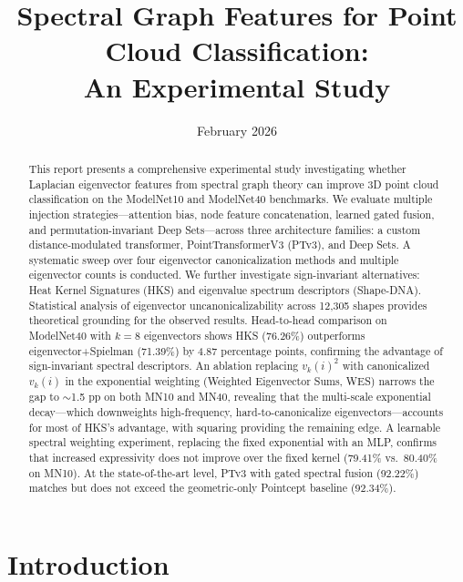 \documentclass[11pt]{article}
\title{Spectral Graph Features for Point Cloud Classification:\\An Experimental Study}
\author{}
\date{February 2026}
\begin{document}
\maketitle

\begin{abstract}
This report presents a comprehensive experimental study investigating whether Laplacian
eigenvector features from spectral graph theory can improve 3D point cloud classification
on the ModelNet10 and ModelNet40 benchmarks. We evaluate multiple injection
strategies---attention bias, node feature concatenation, learned gated fusion, and
permutation-invariant Deep Sets---across three architecture families: a custom
distance-modulated transformer, PointTransformerV3 (PTv3), and Deep Sets. A systematic
sweep over four eigenvector canonicalization methods and multiple eigenvector counts is
conducted. We further investigate sign-invariant alternatives: Heat Kernel Signatures
(HKS) and eigenvalue spectrum descriptors (Shape-DNA). Statistical analysis of
eigenvector uncanonicalizability across 12,305 shapes provides theoretical grounding for
the observed results. Head-to-head comparison on ModelNet40 with $k=8$ eigenvectors shows
HKS (76.26\%) outperforms eigenvector+Spielman (71.39\%) by 4.87 percentage points,
confirming the advantage of sign-invariant spectral descriptors. An ablation replacing
$v_k(i)^2$ with canonicalized $v_k(i)$ in the exponential weighting (Weighted Eigenvector
Sums, WES) narrows the gap to $\sim$1.5 pp on both MN10 and MN40, revealing that the
multi-scale exponential decay---which downweights high-frequency, hard-to-canonicalize
eigenvectors---accounts for most of HKS's advantage, with squaring providing the remaining
edge. A learnable spectral weighting experiment, replacing the fixed exponential with an MLP,
confirms that increased expressivity does not improve over the fixed kernel (79.41\% vs.\
80.40\% on MN10). At the state-of-the-art level, PTv3 with gated spectral fusion (92.22\%) matches but
does not exceed the geometric-only Pointcept baseline (92.34\%).
\end{abstract}

\tableofcontents
\newpage

\section{Introduction}
\end{document}
